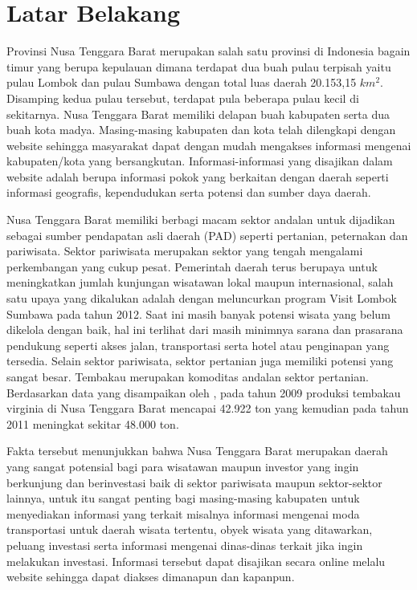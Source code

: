 \section{Latar Belakang}
Provinsi Nusa Tenggara Barat merupakan salah satu provinsi di Indonesia bagain timur yang berupa kepulauan dimana terdapat dua buah pulau terpisah yaitu pulau Lombok dan pulau Sumbawa dengan total luas daerah 20.153,15 $km^{2}$. Disamping kedua pulau tersebut, terdapat pula beberapa pulau kecil di sekitarnya. Nusa Tenggara Barat memiliki delapan buah kabupaten serta dua buah kota madya. Masing-masing kabupaten dan kota telah dilengkapi dengan website sehingga masyarakat dapat dengan mudah mengakses informasi mengenai kabupaten/kota yang bersangkutan. Informasi-informasi yang disajikan dalam website adalah berupa informasi pokok yang berkaitan dengan daerah seperti informasi geografis, kependudukan serta potensi dan sumber daya daerah.

Nusa Tenggara Barat memiliki berbagi macam sektor andalan untuk dijadikan sebagai sumber pendapatan asli daerah (PAD) seperti pertanian, peternakan dan pariwisata. Sektor pariwisata merupakan sektor yang tengah mengalami perkembangan yang cukup pesat. Pemerintah daerah terus berupaya untuk meningkatkan jumlah kunjungan wisatawan lokal maupun internasional, salah satu upaya yang dikalukan adalah dengan meluncurkan program Visit Lombok Sumbawa pada tahun 2012. Saat ini masih banyak potensi wisata yang belum dikelola dengan baik, hal ini terlihat dari masih minimnya sarana dan prasarana pendukung seperti akses jalan, transportasi serta hotel atau penginapan yang tersedia. Selain sektor pariwisata, sektor pertanian juga memiliki potensi yang sangat besar. Tembakau merupakan komoditas andalan sektor pertanian. Berdasarkan data yang disampaikan oleh \citep*{nur_apriana}, pada tahun 2009 produksi tembakau virginia di Nusa Tenggara Barat mencapai 42.922 ton yang kemudian pada tahun 2011 meningkat sekitar 48.000 ton.

Fakta tersebut menunjukkan bahwa Nusa Tenggara Barat merupakan daerah yang sangat potensial bagi para wisatawan maupun investor yang ingin berkunjung dan berinvestasi baik di sektor pariwisata maupun sektor-sektor lainnya, untuk itu sangat penting bagi masing-masing kabupaten untuk menyediakan informasi yang terkait misalnya informasi mengenai moda transportasi untuk daerah wisata tertentu, obyek wisata yang ditawarkan, peluang investasi serta informasi mengenai dinas-dinas terkait jika ingin melakukan investasi. Informasi tersebut dapat disajikan secara online melalu website sehingga dapat diakses dimanapun dan kapanpun.

